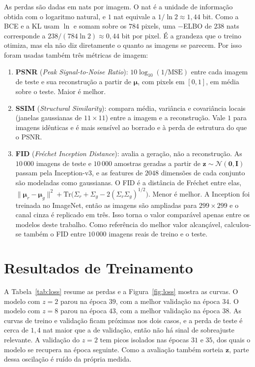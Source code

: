 \documentclass[11pt,a4paper]{article}
\begin{document}
As perdas são dadas em nats por imagem. O nat é a unidade de informação obtida com o logaritmo natural, e $1$ nat equivale a $1/\ln 2 \approx 1{,}44$ bit. Como a BCE e a KL usam $\ln$ e somam sobre os $784$ pixels, uma $-$ELBO de $238$ nats corresponde a $238 / (784 \ln 2) \approx 0{,}44$ bit por pixel. É a grandeza que o treino otimiza, mas ela não diz diretamente o quanto as imagens se parecem. Por isso foram usadas também três métricas de imagem:
\begin{enumerate}
    \item \textbf{PSNR} (\textit{Peak Signal-to-Noise Ratio}): $10 \log_{10}(1/\mathrm{MSE})$ entre cada imagem de teste e sua reconstrução a partir de $\boldsymbol{\mu}$, com pixels em $[0, 1]$, em média sobre o teste. Maior é melhor.
    \item \textbf{SSIM} (\textit{Structural Similarity}): compara média, variância e covariância locais (janelas gaussianas de $11 \times 11$) entre a imagem e a reconstrução. Vale $1$ para imagens idênticas e é mais sensível ao borrado e à perda de estrutura do que o PSNR.
    \item \textbf{FID} (\textit{Fréchet Inception Distance}): avalia a geração, não a reconstrução. As $10\,000$ imagens de teste e $10\,000$ amostras geradas a partir de $\mathbf{z} \sim \mathcal{N}(\mathbf{0}, \mathbf{I})$ passam pela Inception-v3, e as features de $2048$ dimensões de cada conjunto são modeladas como gaussianas. O FID é a distância de Fréchet entre elas, $\|\boldsymbol{\mu}_r - \boldsymbol{\mu}_g\|^2 + \mathrm{Tr}\big(\Sigma_r + \Sigma_g - 2(\Sigma_r\Sigma_g)^{1/2}\big)$. Menor é melhor. A Inception foi treinada no ImageNet, então as imagens são ampliadas para $299 \times 299$ e o canal cinza é replicado em três. Isso torna o valor comparável apenas entre os modelos deste trabalho. Como referência do melhor valor alcançável, calculou-se também o FID entre $10\,000$ imagens reais de treino e o teste.
\end{enumerate}

\section{Resultados de Treinamento}

A Tabela~\ref{tab:loss} resume as perdas e a Figura~\ref{fig:loss} mostra as curvas. O modelo com $z = 2$ parou na época $39$, com a melhor validação na época $34$. O modelo com $z = 8$ parou na época $43$, com a melhor validação na época $38$. As curvas de treino e validação ficam próximas nos dois casos, e a perda de teste é cerca de $1{,}4$ nat maior que a de validação, então não há sinal de sobreajuste relevante. A validação do $z = 2$ tem picos isolados nas épocas $31$ e $35$, dos quais o modelo se recupera na época seguinte. Como a avaliação também sorteia $\mathbf{z}$, parte dessa oscilação é ruído da própria medida.
\end{document}
